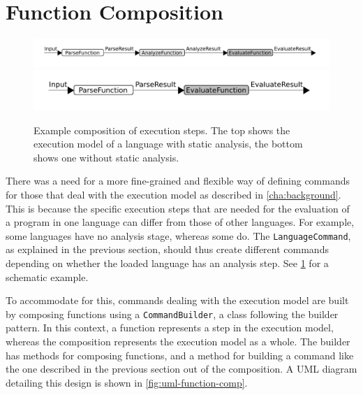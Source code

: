 \makeatletter
\Gscale@div\imgscale\textwidth{\wd0}
\makeatother
%
\section{Function Composition}
\label{sec:function-comp}
\begin{figure}[t]
  \includegraphics[scale=\imgscale]{unit-flow}
  \includegraphics[scale=\imgscale]{unit-flow-no-analyze}
  \caption{Example composition of execution steps. The top shows the
    execution model of a language with static analysis,
    the bottom shows one without static analysis. }
  \label{fig:unit-flow}
\end{figure}

There was a need for a more fine-grained and flexible way of defining commands
for those that deal with the execution model as described in
\cref{cha:background}. This is because the specific
execution steps that are needed for the evaluation of a program in one language
can differ from those of other languages. For example, some languages
have no analysis stage, whereas some do. The \texttt{LanguageCommand}, as
explained in the previous section, should thus create different
commands depending on whether the loaded language has an
analysis step. See \cref{fig:unit-flow} for a schematic example.

To accommodate for this, commands dealing with the execution model are
built by composing functions using a \texttt{CommandBuilder}, a class
following the builder pattern. In this context, a function represents a
step in the execution model, whereas the composition represents the
execution model as a whole. The builder has methods for composing
functions, and a method for building a command like the one described
in the previous section out of the composition. A UML diagram  detailing this
design is shown in \cref{fig:uml-function-comp}.

